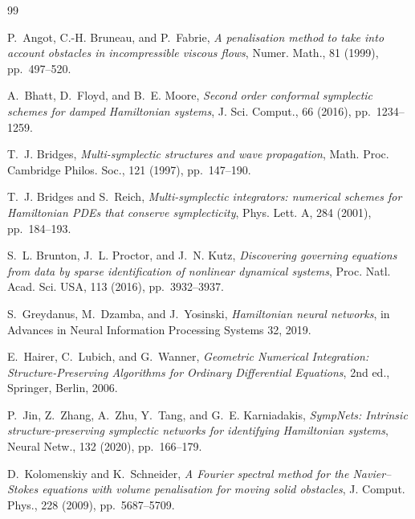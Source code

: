 \documentclass[11pt]{article}
\theoremstyle{definition}
\theoremstyle{remark}
\begin{document}
\begin{thebibliography}{99}

P.~Angot, C.-H. Bruneau, and P.~Fabrie,
\emph{A penalisation method to take into account obstacles in
incompressible viscous flows},
Numer. Math., 81 (1999), pp.~497--520.

A.~Bhatt, D.~Floyd, and B.~E. Moore,
\emph{Second order conformal symplectic schemes for damped Hamiltonian
systems},
J. Sci. Comput., 66 (2016), pp.~1234--1259.

T.~J. Bridges,
\emph{Multi-symplectic structures and wave propagation},
Math. Proc. Cambridge Philos. Soc., 121 (1997), pp.~147--190.

T.~J. Bridges and S.~Reich,
\emph{Multi-symplectic integrators: numerical schemes for Hamiltonian
PDEs that conserve symplecticity},
Phys. Lett. A, 284 (2001), pp.~184--193.

S.~L. Brunton, J.~L. Proctor, and J.~N. Kutz,
\emph{Discovering governing equations from data by sparse
identification of nonlinear dynamical systems},
Proc. Natl. Acad. Sci. USA, 113 (2016), pp.~3932--3937.


S.~Greydanus, M.~Dzamba, and J.~Yosinski,
\emph{Hamiltonian neural networks},
in Advances in Neural Information Processing Systems 32, 2019.

E.~Hairer, C.~Lubich, and G.~Wanner,
\emph{Geometric Numerical Integration: Structure-Preserving Algorithms
for Ordinary Differential Equations},
2nd ed., Springer, Berlin, 2006.

P.~Jin, Z.~Zhang, A.~Zhu, Y.~Tang, and G.~E. Karniadakis,
\emph{SympNets: Intrinsic structure-preserving symplectic networks for
identifying Hamiltonian systems},
Neural Netw., 132 (2020), pp.~166--179.

D.~Kolomenskiy and K.~Schneider,
\emph{A Fourier spectral method for the Navier--Stokes equations with
volume penalisation for moving solid obstacles},
J. Comput. Phys., 228 (2009), pp.~5687--5709.


\end{thebibliography}
\end{document}
